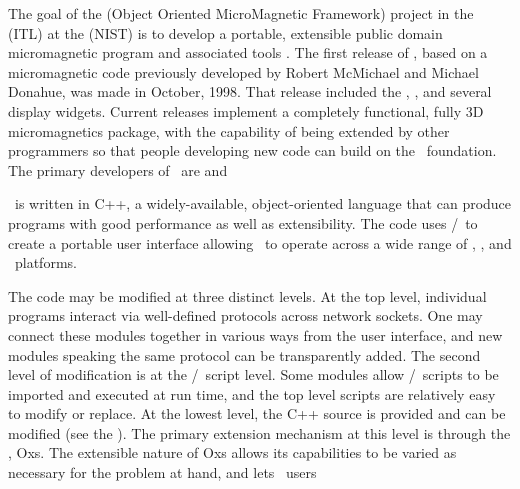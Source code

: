 The goal of the
 (Object
Oriented MicroMagnetic Framework) project in the
 (ITL) at the
 (NIST) is to develop a portable,
extensible public domain micromagnetic program and associated tools
\cite{aharoni1996,brown1963,fidler2000}.  The first release of \OOMMF, based
on a micromagnetic code previously developed by Robert McMichael and
Michael Donahue, was made in October, 1998. That release included the
, , and several display widgets. Current releases
implement a completely functional, fully 3D micromagnetics package, with
the capability of being extended by other programmers so that people
developing new code can build on the \OOMMF\ foundation.  The primary
developers of \OOMMF\ are 
 and

\OOMMF\ is written in C++, a widely-available, object-oriented language
that can produce programs with good performance as well as
extensibility.  The code uses \Tcl/\Tk\ to create a portable user
interface allowing \OOMMF\ to operate across a wide range of \Unix,
\Windows, and \MacOSX\ platforms.

The code may be modified at three distinct levels.  At the top level,
individual programs interact via well-defined protocols across network
sockets.  One may connect these modules together
in various ways from the user interface, and new modules speaking the
same protocol can be transparently added.  The second level of
modification is at the \Tcl/\Tk\ script level.  Some modules allow
\Tcl/\Tk\ scripts to be imported and executed at run time, and the top
level scripts are relatively easy to modify or replace.  At the lowest
level, the C++ source is provided and can be modified (see the
).  The primary extension
mechanism at this level is through the , Oxs. The
extensible nature of Oxs allows its capabilities to be varied as
necessary for the problem at hand, and lets \OOMMF\ users

